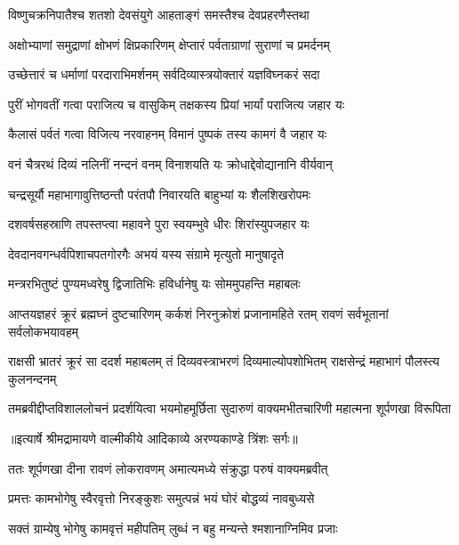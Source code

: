 \twolineshloka
{विष्णुचक्रनिपातैश्च शतशो देवसंयुगे}
{आहताङ्गं समस्तैश्च देवप्रहरणैस्तथा} %

\twolineshloka
{अक्षोभ्याणां समुद्राणां क्षोभणं क्षिप्रकारिणम्}
{क्षेप्तारं पर्वताग्राणां सुराणां च प्रमर्दनम्} %

\twolineshloka
{उच्छेत्तारं च धर्माणां परदाराभिमर्शनम्}
{सर्वदिव्यास्त्रयोक्तारं यज्ञविघ्नकरं सदा} %

\twolineshloka
{पुरीं भोगवतीं गत्वा पराजित्य च वासुकिम्}
{तक्षकस्य प्रियां भार्यां पराजित्य जहार यः} %

\twolineshloka
{कैलासं पर्वतं गत्वा विजित्य नरवाहनम्}
{विमानं पुष्पकं तस्य कामगं वै जहार यः} %

\twolineshloka
{वनं चैत्ररथं दिव्यं नलिनीं नन्दनं वनम्}
{विनाशयति यः क्रोधाद्देवोद्यानानि वीर्यवान्} %

\twolineshloka
{चन्द्रसूर्यौ महाभागावुत्तिष्ठन्तौ परंतपौ}
{निवारयति बाहुभ्यां यः शैलशिखरोपमः} %

\twolineshloka
{दशवर्षसहस्राणि तपस्तप्त्वा महावने}
{पुरा स्वयम्भुवे धीरः शिरांस्युपजहार यः} %

\twolineshloka
{देवदानवगन्धर्वपिशाचपतगोरगैः}
{अभयं यस्य संग्रामे मृत्युतो मानुषादृते} %

\twolineshloka
{मन्त्ररभितुष्टं पुण्यमध्वरेषु द्विजातिभिः}
{हविर्धानेषु यः सोममुपहन्ति महाबलः} %

\threelineshloka
{आप्तयज्ञहरं क्रूरं ब्रह्मघ्नं दुष्टचारिणम्}
{कर्कशं निरनुक्रोशं प्रजानामहिते रतम्}
{रावणं सर्वभूतानां सर्वलोकभयावहम्} %

\threelineshloka
{राक्षसी भ्रातरं क्रूरं सा ददर्श महाबलम्}
{तं दिव्यवस्त्राभरणं दिव्यमाल्योपशोभितम्}
{राक्षसेन्द्रं महाभागं पौलस्त्य कुलनन्दनम्} %

\fourlineindentedshloka
{तमब्रवीद्दीप्तविशाललोचनं}
{ प्रदर्शयित्वा भयमोहमूर्छिता}
{सुदारुणं वाक्यमभीतचारिणी}
{ महात्मना शूर्पणखा विरूपिता} %


{॥इत्यार्षे श्रीमद्रामायणे वाल्मीकीये आदिकाव्ये अरण्यकाण्डे त्रिंशः सर्गः॥}


\twolineshloka
{ततः शूर्पणखा दीना रावणं लोकरावणम्}
{अमात्यमध्ये संक्रुद्धा परुषं वाक्यमब्रवीत्} %

\twolineshloka
{प्रमत्तः कामभोगेषु स्वैरवृत्तो निरङ्कुशः}
{समुत्पन्नं भयं घोरं बोद्धव्यं नावबुध्यसे} %

\twolineshloka
{सक्तं ग्राम्येषु भोगेषु कामवृत्तं महीपतिम्}
{लुब्धं न बहु मन्यन्ते श्मशानाग्निमिव प्रजाः} %

